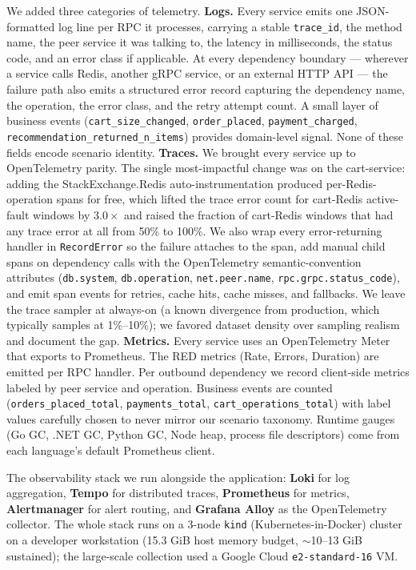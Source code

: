 We added three categories of telemetry. \textbf{Logs.} Every service emits one JSON-formatted log line per RPC it processes, carrying a stable \texttt{trace\_id}, the method name, the peer service it was talking to, the latency in milliseconds, the status code, and an error class if applicable. At every dependency boundary --- wherever a service calls Redis, another gRPC service, or an external HTTP API --- the failure path also emits a structured error record capturing the dependency name, the operation, the error class, and the retry attempt count. A small layer of business events (\texttt{cart\_size\_changed}, \texttt{order\_placed}, \texttt{payment\_charged}, \texttt{recommendation\_returned\_n\_items}) provides domain-level signal. None of these fields encode scenario identity. \textbf{Traces.} We brought every service up to OpenTelemetry parity. The single most-impactful change was on the cart-service: adding the StackExchange.Redis auto-instrumentation produced per-Redis-operation spans for free, which lifted the trace error count for cart-Redis active-fault windows by $3.0\times$ and raised the fraction of cart-Redis windows that had any trace error at all from 50\% to 100\%. We also wrap every error-returning handler in \texttt{RecordError} so the failure attaches to the span, add manual child spans on dependency calls with the OpenTelemetry semantic-convention attributes (\texttt{db.system}, \texttt{db.operation}, \texttt{net.peer.name}, \texttt{rpc.grpc.status\_code}), and emit span events for retries, cache hits, cache misses, and fallbacks. We leave the trace sampler at always-on (a known divergence from production, which typically samples at 1\%--10\%); we favored dataset density over sampling realism and document the gap. \textbf{Metrics.} Every service uses an OpenTelemetry Meter that exports to Prometheus. The RED metrics (Rate, Errors, Duration) are emitted per RPC handler. Per outbound dependency we record client-side metrics labeled by peer service and operation. Business events are counted (\texttt{orders\_placed\_total}, \texttt{payments\_total}, \texttt{cart\_operations\_total}) with label values carefully chosen to never mirror our scenario taxonomy. Runtime gauges (Go GC, .NET GC, Python GC, Node heap, process file descriptors) come from each language's default Prometheus client.

The observability stack we run alongside the application: \textbf{Loki} for log aggregation, \textbf{Tempo} for distributed traces, \textbf{Prometheus} for metrics, \textbf{Alertmanager} for alert routing, and \textbf{Grafana Alloy} as the OpenTelemetry collector. The whole stack runs on a 3-node \texttt{kind} (Kubernetes-in-Docker) cluster on a developer workstation (15.3 GiB host memory budget, $\sim$10--13 GiB sustained); the large-scale collection used a Google Cloud \texttt{e2-standard-16} VM.

